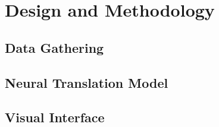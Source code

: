 \chapter{Design and Methodology}
\section{Data Gathering}
\section{Neural Translation Model}
\section{Visual Interface}